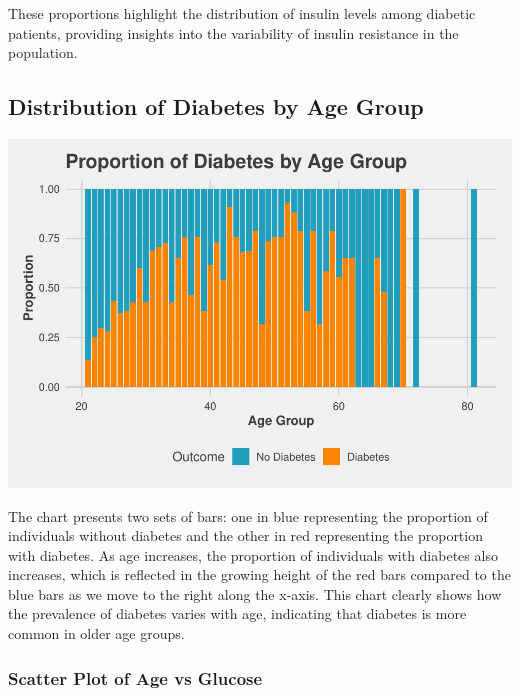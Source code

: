 \documentclass[
]{article}
\begin{document}
These proportions highlight the distribution of insulin levels among
diabetic patients, providing insights into the variability of insulin
resistance in the population.

\subsection{Distribution of Diabetes by Age
Group}\label{distribution-of-diabetes-by-age-group}

\begin{center}\includegraphics{Diabetes-Project_files/figure-latex/diabetes by age-1} \end{center}

The chart presents two sets of bars: one in blue representing the
proportion of individuals without diabetes and the other in red
representing the proportion with diabetes. As age increases, the
proportion of individuals with diabetes also increases, which is
reflected in the growing height of the red bars compared to the blue
bars as we move to the right along the x-axis. This chart clearly shows
how the prevalence of diabetes varies with age, indicating that diabetes
is more common in older age groups.

\subsubsection{Scatter Plot of Age vs
Glucose}\label{scatter-plot-of-age-vs-glucose}
\end{document}
